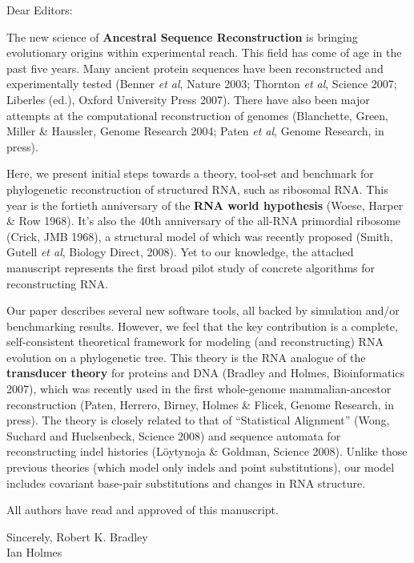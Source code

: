 \documentclass[10pt]{letter}
\begin{document}
\begin{letter}{}

\opening{Dear Editors:}

\vspace{\baselineskip}

The new science of {\bf Ancestral Sequence Reconstruction} is bringing evolutionary origins within experimental reach.
This field has come of age in the past five years.
Many ancient protein sequences have been reconstructed and experimentally tested
(Benner {\em et al}, Nature 2003;
Thornton {\em et al}, Science 2007;
Liberles (ed.), Oxford University Press 2007).
There have also been major attempts at the
computational reconstruction of genomes
(Blanchette, Green, Miller \& Haussler, Genome Research 2004;
Paten {\em et al}, Genome Research, in press).

Here, we present initial steps towards a theory, tool-set and benchmark for phylogenetic reconstruction of structured RNA,
such as ribosomal RNA.
This year is the fortieth anniversary of the {\bf RNA world hypothesis}
(Woese, Harper \& Row 1968).
It's also the 40th anniversary of the all-RNA primordial ribosome
(Crick, JMB 1968),
a structural model of which was recently proposed
(Smith, Gutell {\em et al}, Biology Direct, 2008).
Yet to our knowledge, the attached manuscript represents the first broad pilot study of concrete algorithms for reconstructing RNA.

Our paper describes several new software tools, all backed by simulation and/or benchmarking results.
However, we feel that the key contribution is a complete, self-consistent theoretical framework for modeling (and reconstructing) RNA evolution on a phylogenetic tree.
This theory is the RNA analogue of the {\bf transducer theory} for proteins and DNA
(Bradley and Holmes, Bioinformatics 2007),
which was recently used in the first whole-genome mammalian-ancestor reconstruction
(Paten, Herrero, Birney, Holmes \& Flicek, Genome Research, in press).
The theory is closely related to that of ``Statistical Alignment''
(Wong, Suchard and Huelsenbeck, Science 2008)
and sequence automata for reconstructing indel histories
(L\"{o}ytynoja \& Goldman, Science 2008).
Unlike those previous theories (which model only indels and point substitutions),
our model includes covariant base-pair substitutions and changes in RNA structure.

\newpage
All authors have read and approved of this manuscript.



\closing{Sincerely,\vskip 20pt Robert K. Bradley\\Ian Holmes}


\end{letter}
\end{document}
